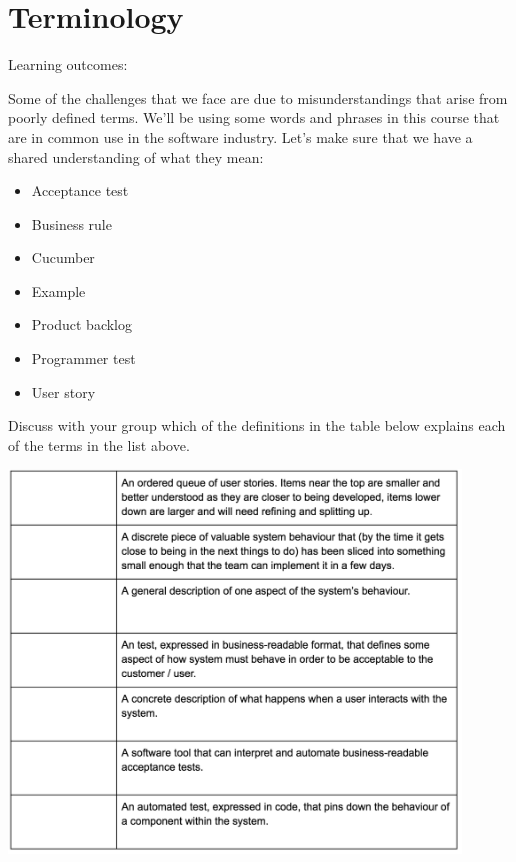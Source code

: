 \chapter*{Terminology}

\ifnotes

    Learning outcomes:

\fi

\ifcontent

    Some of the challenges that we face are due to misunderstandings that arise from poorly defined terms. We'll be using some words and phrases in this course that are in common use in the software industry. Let's make sure that we have a shared understanding of what they mean:
    
    \begin{itemize}
        \item Acceptance test
        \item Business rule
        \item Cucumber
        \item Example
        \item Product backlog
        \item Programmer test
        \item User story
    \end{itemize}
 
     Discuss with your group which of the definitions in the table below explains each of the terms in the list above.
     
     \begin{center}
        \includegraphics[width=0.9\textwidth]{../bdd-fundamentals/images/terminology-table}
     \end{center}
\fi